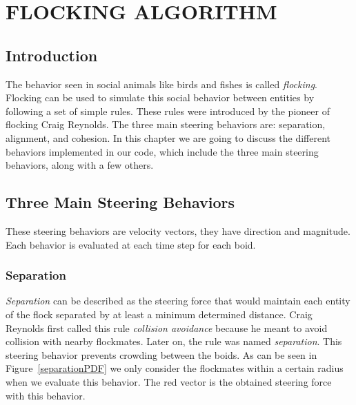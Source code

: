 \chapter{FLOCKING ALGORITHM}

\section{Introduction}
The behavior seen in social animals like birds and fishes is called \textit{flocking}. Flocking can be used to simulate this social behavior between entities by following a set of simple rules. These rules were introduced by the pioneer of flocking Craig Reynolds\cite{craig1}. The three main steering behaviors are: separation, alignment, and cohesion. In this chapter we are going to discuss the different behaviors implemented in our code, which include the three main steering behaviors, along with a few others.

\section{Three Main Steering Behaviors}
These steering behaviors are velocity vectors, they have direction and magnitude. Each behavior is evaluated at each time step for each boid.

\subsection{Separation}\label{separationsection}
\textit{Separation} can be described as the steering force that would maintain each entity of the flock separated by at least a minimum determined distance. Craig Reynolds first called this rule \textit{collision avoidance} because he meant to avoid collision with nearby flockmates. Later on, the rule was named \textit{separation}. This steering behavior prevents crowding between the boids. As can be seen in Figure~\ref{separationPDF} we only consider the flockmates within a certain radius when we evaluate this behavior. The red vector is the obtained steering force with this behavior.

